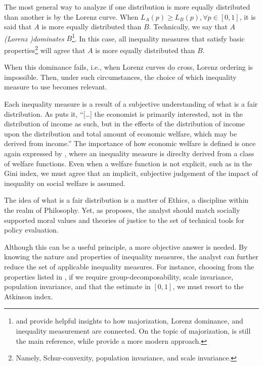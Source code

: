 \documentclass[]{book}
\begin{document}
The most general way to analyze if one distribution is more equally distributed than another is by the Lorenz curve. When \(L_A(p) \geqslant L_B(p), \forall p \in [0,1]\), it is said that \(A\) is more equally distributed than \(B\). Technically, we say that \(A\) \emph{(Lorenz )dominates} \(B\)\footnote{\citet{kramer1998} and \citet{mosler1994} provide helpful insights to how majorization, Lorenz dominance, and inequality measurement are connected. On the topic of majorization, \citet{hardy1934} is still the main reference, while \citet{olkin2011} provide a more modern approach.}. In this case, all inequality measures that satisfy basic properties\footnote{Namely, Schur-convexity, population invariance, and scale invariance.} will agree that \(A\) is more equally distributed than \(B\).

When this dominance fails, i.e., when Lorenz curves do cross, Lorenz ordering is impossible. Then, under such circumstances, the choice of which inequality measure to use becomes relevant.

Each inequality measure is a result of a subjective understanding of what is a fair distribution. As \citet[p.348]{dalton1920} puts it, ``{[}\ldots{}{]} the economist is primarily interested, not in the distribution of income as such, but in the effects of the distribution of income upon the distribution and total amount of economic welfare, which may be derived from income.'' The importance of how economic welfare is defined is once again expressed by \citet{atkinson1970}, where an inequality measure is direclty derived from a class of welfare functions. Even when a welfare function is not explicit, such as in the Gini index, we must agree that an implicit, subjective judgement of the impact of inequality on social welfare is assumed.

The idea of what is a fair distribution is a matter of Ethics, a discipline within the realm of Philosophy. Yet, as \citet[Ch.1]{fleur1996} proposes, the analyst should match socially supported moral values and theories of justice to the set of technical tools for policy evaluation.

Although this can be a useful principle, a more objective answer is needed. By knowing the nature and properties of inequality measures, the analyst can further reduce the set of applicable inequality measures. For instance, choosing from the properties listed in \citet[p.74]{cowell2011}, if we require group-decomposability, scale invariance, population invariance, and that the estimate in \([0,1]\), we must resort to the Atkinson index.
\end{document}
